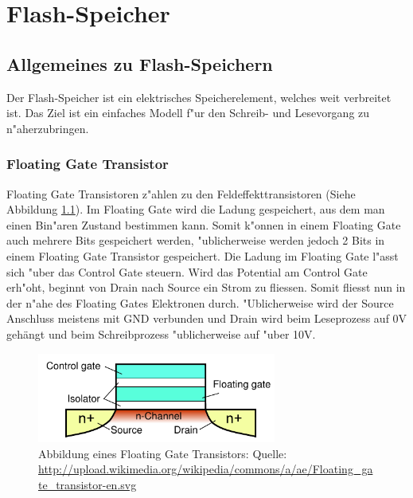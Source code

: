 \chapter{Flash-Speicher\label{chapter:flash}}
\begin{refsection}

\section{Allgemeines zu Flash-Speichern}
Der Flash-Speicher ist ein elektrisches Speicherelement, welches
weit verbreitet ist.
Das Ziel ist ein einfaches Modell f"ur den Schreib- und Lesevorgang
zu n"aherzubringen.

\subsection{Floating Gate Transistor}
Floating Gate Transistoren z"ahlen zu den Feldeffekttransistoren
(Siehe Abbildung \ref{skript:Floatinggatetransistor}).
Im Floating Gate wird die Ladung gespeichert, aus dem man einen Bin"aren
Zustand bestimmen kann.
Somit k"onnen in einem Floating Gate auch mehrere Bits gespeichert
werden, "ublicherweise werden jedoch 2 Bits in einem Floating Gate
Transistor gespeichert.
Die Ladung im Floating Gate l"asst sich "uber das Control Gate steuern.
Wird das Potential am Control Gate erh"oht, beginnt von Drain nach
Source ein Strom zu fliessen.
Somit fliesst nun in der n"ahe des Floating Gates Elektronen durch.
"Ublicherweise wird der Source Anschluss meistens mit GND verbunden und
Drain wird beim Leseprozess auf 0V gehängt und beim Schreibprozess
"ublicherweise auf "uber 10V.

\begin{figure}
\centering
\includegraphics[width=0.7\textwidth]{flash/graphics/Floatinggate.pdf}
\caption{Abbildung eines Floating Gate Transistors: Quelle:
\url{http://upload.wikimedia.org/wikipedia/commons/a/ae/Floating_gate_transistor-en.svg}
\label{skript:Floatinggatetransistor}}
\end{figure}


\end{refsection}
